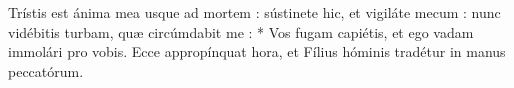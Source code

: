 Trístis est ánima mea usque ad mortem : sústinete hic, et vigiláte mecum : nunc vidébitis turbam, quæ circúmdabit me :
* Vos fugam capiétis, et ego vadam immolári pro vobis.
\versseparator
 Ecce appropínquat hora, et Fílius hóminis tradétur in manus peccatórum.